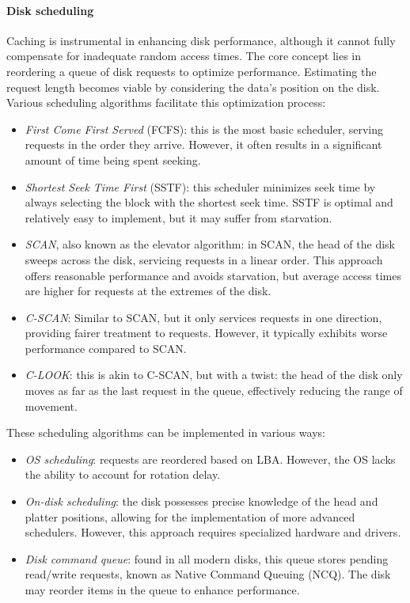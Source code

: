 \paragraph*{Disk scheduling}
Caching is instrumental in enhancing disk performance, although it cannot fully compensate for inadequate random access times. 
The core concept lies in reordering a queue of disk requests to optimize performance. 
Estimating the request length becomes viable by considering the data's position on the disk.
Various scheduling algorithms facilitate this optimization process:
\begin{itemize}
    \item \textit{First Come First Served} (FCFS): this is the most basic scheduler, serving requests in the order they arrive. 
        However, it often results in a significant amount of time being spent seeking.
    \item \textit{Shortest Seek Time First} (SSTF): this scheduler minimizes seek time by always selecting the block with the shortest seek time. 
        SSTF is optimal and relatively easy to implement, but it may suffer from starvation.
    \item \textit{SCAN}, also known as the elevator algorithm: in SCAN, the head of the disk sweeps across the disk, servicing requests in a linear order. 
        This approach offers reasonable performance and avoids starvation, but average access times are higher for requests at the extremes of the disk.
    \item \textit{C-SCAN}: Similar to SCAN, but it only services requests in one direction, providing fairer treatment to requests. 
        However, it typically exhibits worse performance compared to SCAN.
    \item \textit{C-LOOK}: this is akin to C-SCAN, but with a twist: the head of the disk only moves as far as the last request in the queue, effectively reducing the range of movement.
\end{itemize}
These scheduling algorithms can be implemented in various ways:
\begin{itemize}
    \item \textit{OS scheduling}: requests are reordered based on LBA. 
        However, the OS lacks the ability to account for rotation delay.
    \item \textit{On-disk scheduling}: the disk possesses precise knowledge of the head and platter positions, allowing for the implementation of more advanced schedulers. 
        However, this approach requires specialized hardware and drivers.
    \item \textit{Disk command queue}: found in all modern disks, this queue stores pending read/write requests, known as Native Command Queuing (NCQ). 
        The disk may reorder items in the queue to enhance performance.
\end{itemize}

